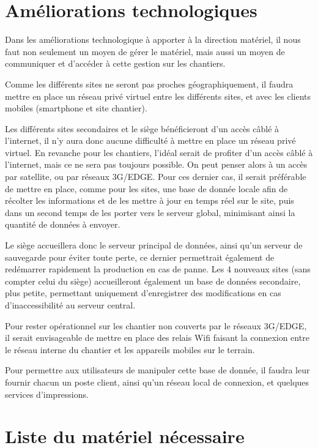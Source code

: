 \section{Améliorations technologiques}

    Dans les améliorations technologique à apporter à la direction matériel, il nous faut non seulement un moyen de gérer le matériel, mais aussi un moyen de communiquer et d'accéder à cette gestion sur les chantiers.

    Comme les différents sites ne seront pas proches géographiquement, il faudra mettre en place un réseau privé virtuel entre les différents sites, et avec les clients mobiles (smartphone et site chantier).

    Les différents sites secondaires et le siège bénéficieront d'un accès câblé à l'internet, il n'y aura donc aucune difficulté à mettre en place un réseau privé virtuel.
    En revanche pour les chantiers, l'idéal serait de profiter d'un accès câblé à l'internet, mais ce ne sera pas toujours possible. On peut penser alors à un accès par satellite, ou par réseaux 3G/EDGE. Pour ces dernier cas, il serait préférable de mettre en place, comme pour les sites, une base de donnée locale afin de récolter les informations et de les mettre à jour en temps réel sur le site, puis dans un second temps de les porter vers le serveur global, minimisant ainsi la quantité de données à envoyer.

    Le siège accueillera donc le serveur principal de données, ainsi qu'un serveur de sauvegarde pour éviter toute perte, ce dernier permettrait également de redémarrer rapidement la production en cas de panne. Les 4 nouveaux sites (sans compter celui du siège) accueilleront également un base de données secondaire, plus petite, permettant uniquement d'enregistrer des modifications en cas d'inaccessibilité au serveur central.

    Pour rester opérationnel sur les chantier non couverts par le réseaux 3G/EDGE, il serait envisageable de mettre en place des relais Wifi faisant la connexion entre le réseau interne du chantier et les appareils mobiles sur le terrain.

    Pour permettre aux utilisateurs de manipuler cette base de donnée, il faudra leur fournir chacun un poste client, ainsi qu'un réseau local de connexion, et quelques services d'impressions.


\section{Liste du matériel nécessaire}
